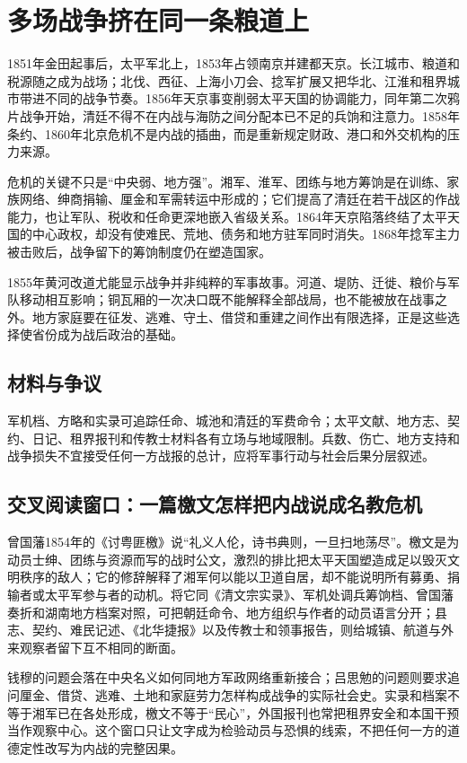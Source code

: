 \section{多场战争挤在同一条粮道上}

1851年金田起事后，太平军北上，1853年占领南京并建都天京。长江城市、粮道和税源随之成为战场；北伐、西征、上海小刀会、捻军扩展又把华北、江淮和租界城市带进不同的战争节奏。1856年天京事变削弱太平天国的协调能力，同年第二次鸦片战争开始，清廷不得不在内战与海防之间分配本已不足的兵饷和注意力。1858年条约、1860年北京危机不是内战的插曲，而是重新规定财政、港口和外交机构的压力来源。

危机的关键不只是“中央弱、地方强”。湘军、淮军、团练与地方筹饷是在训练、家族网络、绅商捐输、厘金和军需转运中形成的；它们提高了清廷在若干战区的作战能力，也让军队、税收和任命更深地嵌入省级关系。1864年天京陷落终结了太平天国的中心政权，却没有使难民、荒地、债务和地方驻军同时消失。1868年捻军主力被击败后，战争留下的筹饷制度仍在塑造国家。

1855年黄河改道尤能显示战争并非纯粹的军事故事。河道、堤防、迁徙、粮价与军队移动相互影响；铜瓦厢的一次决口既不能解释全部战局，也不能被放在战事之外。地方家庭要在征发、逃难、守土、借贷和重建之间作出有限选择，正是这些选择使省份成为战后政治的基础。

\subsection{材料与争议}

军机档、方略和实录可追踪任命、城池和清廷的军费命令；太平文献、地方志、契约、日记、租界报刊和传教士材料各有立场与地域限制。兵数、伤亡、地方支持和战争损失不宜接受任何一方战报的总计，应将军事行动与社会后果分层叙述。

\subsection{交叉阅读窗口：一篇檄文怎样把内战说成名教危机}

曾国藩1854年的《讨粤匪檄》说“礼义人伦，诗书典则，一旦扫地荡尽”。檄文是为动员士绅、团练与资源而写的战时公文，激烈的排比把太平天国塑造成足以毁灭文明秩序的敌人；它的修辞解释了湘军何以能以卫道自居，却不能说明所有募勇、捐输者或太平军参与者的动机。将它同《清文宗实录》、军机处调兵筹饷档、曾国藩奏折和湖南地方档案对照，可把朝廷命令、地方组织与作者的动员语言分开；县志、契约、难民记述、《北华捷报》以及传教士和领事报告，则给城镇、航道与外来观察者留下互不相同的断面。

钱穆的问题会落在中央名义如何同地方军政网络重新接合；吕思勉的问题则要求追问厘金、借贷、逃难、土地和家庭劳力怎样构成战争的实际社会史。实录和档案不等于湘军已在各处形成，檄文不等于“民心”，外国报刊也常把租界安全和本国干预当作观察中心。这个窗口只让文字成为检验动员与恐惧的线索，不把任何一方的道德定性改写为内战的完整因果。

